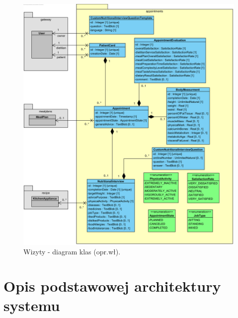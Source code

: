 \begin{minipage}{\textwidth}
    \begin{figure}[H]
        \centering\includegraphics[scale=0.7]{../uml/class_diagrams/appointments.png}
        \caption{Wizyty - diagram klas (opr.wł).}\label{rysunek:class-diagram-appointments}
    \end{figure}
\end{minipage}



\thispagestyle{normal}

\section{Opis podstawowej architektury systemu}

\thispagestyle{normal}
